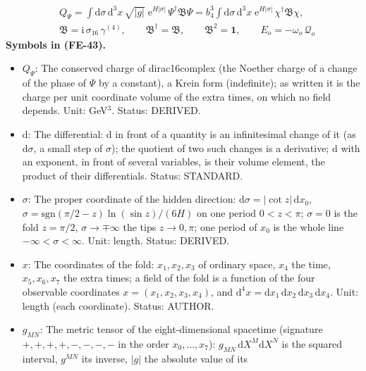 \documentclass[
  10pt,
]{article}
\providecommand{\tightlist}{%
  \setlength{\itemsep}{0pt}\setlength{\parskip}{0pt}}
\begin{document}
\[
\begin{aligned}
&Q_\Psi = \int\mathrm{d}\sigma\,\mathrm{d}^3x\,\sqrt{\lvert g\rvert}\;\mathrm{e}^{H\lvert\sigma\rvert}\,\Psi^\dagger\mathfrak{B}\Psi
 = b_4^3\int\mathrm{d}\sigma\,\mathrm{d}^3x\;\mathrm{e}^{H\lvert\sigma\rvert}\,\chi^\dagger\mathfrak{B}\chi,\\
&\mathfrak{B} = \mathrm{i}\,\sigma_{16}\,\gamma^{(4)},\qquad \mathfrak{B}^\dagger = \mathfrak{B},\qquad \mathfrak{B}^2 = \mathbf{1},\qquad
E_o = -\omega_o\,\mathcal{Q}_o
\end{aligned} \tag{FE-43}
\] \textbf{Symbols in (FE-43).}

\begin{itemize}
\tightlist
\item
  \(Q_\Psi\): The conserved charge of dirac16complex (the Noether charge
  of a change of the phase of \(\Psi\) by a constant), a Krein form
  (indefinite); as written it is the charge per unit coordinate volume
  of the extra times, on which no field depends. Unit: GeV\(^3\).
  Status: DERIVED.
\item
  \(\mathrm{d}\): The differential: \(\mathrm{d}\) in front of a
  quantity is an infinitesimal change of it (as \(\mathrm{d}\sigma\), a
  small step of \(\sigma\)); the quotient of two such changes is a
  derivative; \(\mathrm{d}\) with an exponent, in front of several
  variables, is their volume element, the product of their
  differentials. Status: STANDARD.
\item
  \(\sigma\): The proper coordinate of the hidden direction:
  \(\mathrm{d}\sigma = \lvert\cot z\rvert\,\mathrm{d}x_0\),
  \(\sigma = \mathrm{sgn}(\pi/2 - z)\ln(\sin z)/(6H)\) on one period
  \(0 < z < \pi\); \(\sigma = 0\) is the fold \(z = \pi/2\),
  \(\sigma \to \mp\infty\) the tips \(z \to 0, \pi\); one period of
  \(x_0\) is the whole line \(-\infty < \sigma < \infty\). Unit: length.
  Status: DERIVED.
\item
  \(x\): The coordinates of the fold: \(x_1, x_2, x_3\) of ordinary
  space, \(x_4\) the time, \(x_5, x_6, x_7\) the extra times; a field of
  the fold is a function of the four observable coordinates
  \(x = (x_1, x_2, x_3, x_4)\), and
  \(\mathrm{d}^4x = \mathrm{d}x_1\,\mathrm{d}x_2\,\mathrm{d}x_3\,\mathrm{d}x_4\).
  Unit: length (each coordinate). Status: AUTHOR.
\item
  \(g_{MN}\): The metric tensor of the eight-dimensional spacetime
  (signature \(+,+,+,+,-,-,-,-\) in the order \(x_0, \dots, x_7\)):
  \(g_{MN}\,\mathrm{d}X^M\mathrm{d}X^N\) is the squared interval,
  \(g^{MN}\) its inverse, \(\lvert g\rvert\) the absolute value of its

\end{itemize}
\end{document}
